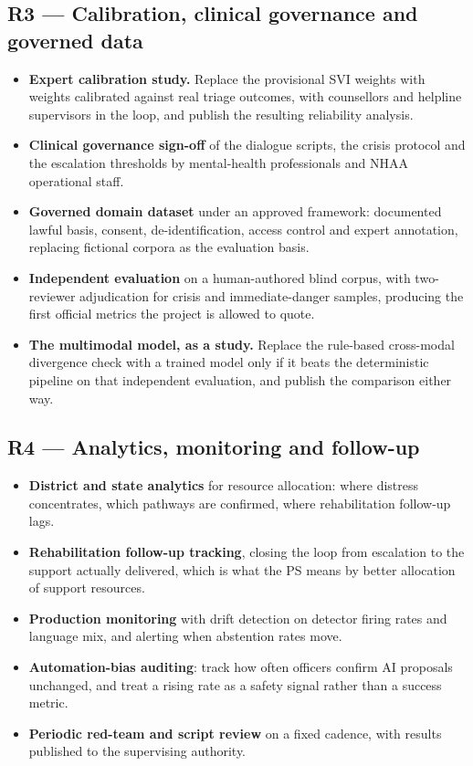 \documentclass[11pt,a4paper]{article}
\begin{document}
\subsection{R3 --- Calibration, clinical governance and governed data}
\begin{itemize}
  \item \textbf{Expert calibration study.} Replace the provisional SVI weights with weights
        calibrated against real triage outcomes, with counsellors and helpline supervisors in the
        loop, and publish the resulting reliability analysis.
  \item \textbf{Clinical governance sign-off} of the dialogue scripts, the crisis protocol and the
        escalation thresholds by mental-health professionals and NHAA operational staff.
  \item \textbf{Governed domain dataset} under an approved framework: documented lawful basis,
        consent, de-identification, access control and expert annotation, replacing fictional corpora
        as the evaluation basis.
  \item \textbf{Independent evaluation} on a human-authored blind corpus, with two-reviewer
        adjudication for crisis and immediate-danger samples, producing the first official metrics the
        project is allowed to quote.
  \item \textbf{The multimodal model, as a study.} Replace the rule-based cross-modal divergence check
        with a trained model only if it beats the deterministic pipeline on that independent
        evaluation, and publish the comparison either way.
\end{itemize}

\subsection{R4 --- Analytics, monitoring and follow-up}
\begin{itemize}
  \item \textbf{District and state analytics} for resource allocation: where distress concentrates,
        which pathways are confirmed, where rehabilitation follow-up lags.
  \item \textbf{Rehabilitation follow-up tracking}, closing the loop from escalation to the support
        actually delivered, which is what the PS means by better allocation of support resources.
  \item \textbf{Production monitoring} with drift detection on detector firing rates and language
        mix, and alerting when abstention rates move.
  \item \textbf{Automation-bias auditing}: track how often officers confirm AI proposals unchanged,
        and treat a rising rate as a safety signal rather than a success metric.
  \item \textbf{Periodic red-team and script review} on a fixed cadence, with results published to
        the supervising authority.
\end{itemize}
\end{document}
